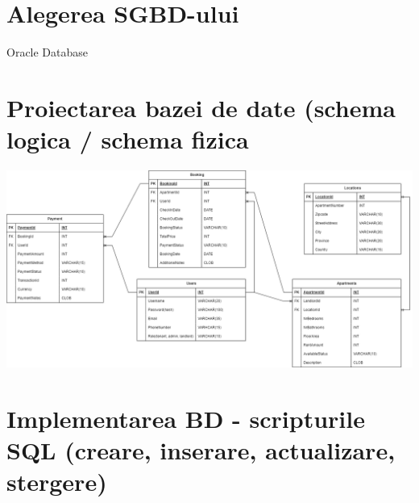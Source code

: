 \documentclass[12pt]{article} %
\begin{document}
\section{Alegerea SGBD-ului}
Oracle Database

\section{Proiectarea bazei de date (schema logica / schema fizica}
\includegraphics[scale=0.3]{SchemaBD.drawio.png}

\section{Implementarea BD - scripturile SQL (creare, inserare, actualizare, stergere)}

\end{document}
